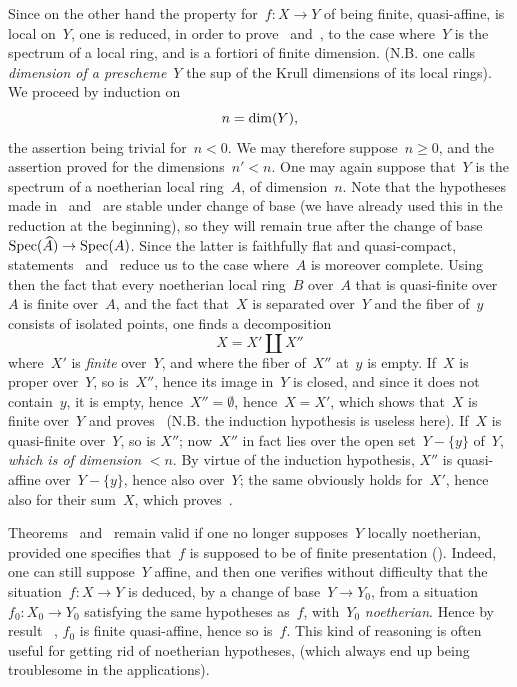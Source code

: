 Since on the other hand the property for~$f\colon X\to Y$
of being finite, \resp quasi-affine, is local on~$Y$, one is
reduced, in order to prove~ and~, to the case
where~$Y$ is the spectrum of a local ring, and is a fortiori of
finite dimension. (N.B. one calls \emph{dimension of a
prescheme}~$Y$ the sup of the Krull dimensions of its local
rings). We proceed by induction on~$$
n=\dim(Y),
$$
the assertion
being trivial for~$n<0$. We may therefore suppose~$n\geq 0$,
and the assertion proved for the dimensions~$n'<n$. One may
again suppose that~$Y$ is the spectrum of a noetherian local
ring~$A$, of dimension~$n$. Note that the hypotheses
made in~ and~ are stable under
change of base (we have already used this in the reduction
at the beginning), so they will remain true after the change
of base~$\Spec(\widehat{A})\to \Spec(A)$. Since the latter is
faithfully flat and quasi-compact,
statements~ and~ reduce us to the
case where~$A$ is moreover complete. Using then the fact that every
noetherian local ring~$B$ over~$A$ that is quasi-finite over~$A$ is finite
over~$A$, and the fact that~$X$ is separated over~$Y$ and the fiber
of~$y$ consists of isolated points, one finds a
decomposition
$$
X=X'\amalg X''
$$
where~$X'$ is \emph{finite} over~$Y$, and where the fiber of~$X''$
at~$y$ is empty. If~$X$ is proper over~$Y$, so is~$X''$,
hence its image in~$Y$ is closed, and since it does not
contain~$y$, it is empty, hence~$X''=\emptyset$, hence~$X=X'$,
which shows that~$X$ is finite over~$Y$ and proves~
(N.B. the induction hypothesis is useless here). If~$X$ is
quasi-finite over~$Y$, so is $X''$; now~$X''$ in fact lies over
the open set~$Y-\{ y\}$
of~$Y$, \emph{which is of dimension} $<n$. By virtue of the induction
hypothesis, $X''$ is quasi-affine
over~$Y-\{ y\}$,
hence also over~$Y$; the same obviously holds for~$X'$, hence
also for their sum~$X$, which proves~.

\begin{remark}
\label{VIII.6.6}
Theorems~ and~ remain
valid if one no longer supposes~$Y$ locally noetherian,
provided one specifies that~$f$ is supposed to be of finite
presentation
(\cf {}).
Indeed, one can still suppose~$Y$ affine, and then one verifies
without difficulty that the situation~$f\colon X\to Y$ is
deduced,
by a change of base~$Y\to Y_{0}$, from a situation~$f_{0}\colon
X_{0}\to Y_{0}$ satisfying the same hypotheses as~$f$,
with~$Y_{0}$ \emph{noetherian}. Hence by
result~ \resp {}, $f_{0}$ is finite
\resp quasi-affine, hence so is~$f$. This kind of
reasoning is often useful for getting rid of
noetherian hypotheses,
(which always end up being troublesome in the
applications).
\end{remark}
